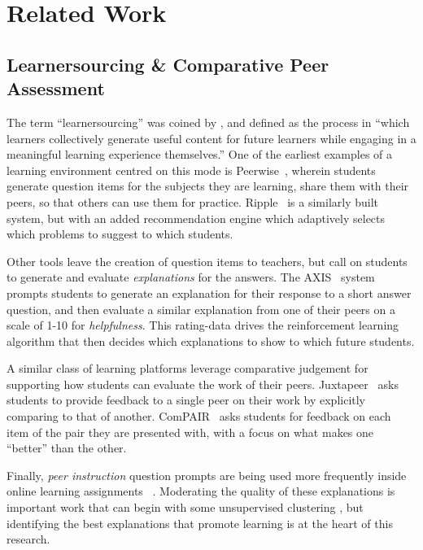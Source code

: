 \documentclass[runningheads]{llncs}
\begin{document}
\section{Related Work}


\subsection{Learnersourcing \& Comparative Peer Assessment}
The term ``learnersourcing'' was coined by \cite{weir_learnersourcing_2015}, 
and defined as the process in ``which learners collectively generate useful 
content for future learners while engaging in a meaningful learning experience 
themselves.'' 
One of the earliest examples of a learning environment centred on this mode is  
Peerwise~\cite{denny_peerwise:_2008}, wherein students generate question items 
for the subjects they are learning, share them with their peers, so that others 
can use them for practice. 
Ripple~\cite{khosravi_ripple_2019} is a similarly built system, but with an 
added recommendation engine which adaptively selects which problems to suggest 
to which students.

Other tools leave the creation of question items to teachers, but call on 
students to generate and evaluate \textit{explanations} for the answers.
The AXIS~\cite{williams_axis:_2016} system prompts students to
generate an explanation for their response to a short answer question, and then 
evaluate a similar explanation from one of their peers on a scale of 1-10 for 
\textit{helpfulness}. This rating-data drives the reinforcement learning 
algorithm that then decides which explanations to show to which future students.

A similar class of learning platforms leverage comparative judgement for 
supporting how students can evaluate the work of their peers. 
Juxtapeer~\cite{cambre_juxtapeer:_2018} asks students to provide feedback to a 
single peer on their work by explicitly comparing to that of another.
ComPAIR~\cite{potter_compair:_2017} asks students for feedback on each item of 
the pair they are presented with, with a focus on what makes one ``better'' 
than the other.

Finally, \textit{peer instruction} question prompts are being used more 
frequently inside online learning 
assignments~\cite{univeristy_of_british_columbia_ubc/ubcpi_2019}
\cite{charles_harnessing_2019}.
Moderating the quality of these explanations is important work that can begin 
with some unsupervised clustering \cite{gagnon_filtering_2019}, but identifying 
the best explanations that promote learning is at the heart of this research.
\end{document}
